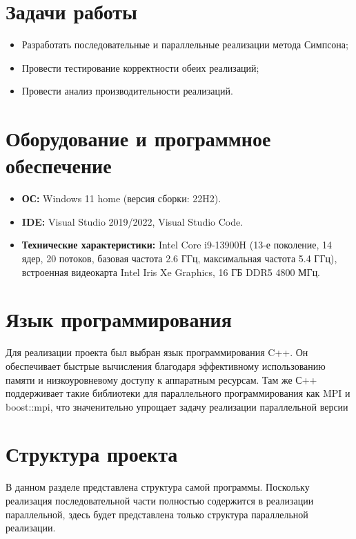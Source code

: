 \documentclass[12pt,a4paper]{article}
\begin{document}
\section*{Задачи работы}

\begin{itemize}
    \item Разработать последовательные и параллельные реализации метода Симпсона;
    \item Провести тестирование корректности обеих реализаций;
    \item Провести анализ производительности реализаций.
\end{itemize}

\section*{Оборудование и программное обеспечение}

\begin{itemize}
    \item \textbf{ОС:} Windows 11 home (версия сборки: 22H2).
    \item \textbf{IDE:} Visual Studio 2019/2022, Visual Studio Code.
    \item \textbf{Технические характеристики:} Intel Core i9-13900H (13-е поколение, 14 ядер, 20 потоков, базовая частота 2.6 ГГц, максимальная частота 5.4 ГГц), встроенная видеокарта Intel Iris Xe Graphics, 16 ГБ DDR5 4800 МГц.
\end{itemize}

\section*{Язык программирования}

Для реализации проекта был выбран язык программирования C++. Он обеспечивает быстрые вычисления благодаря эффективному использованию памяти и низкоуровневому доступу к аппаратным ресурсам. Там же С++  поддерживает такие библиотеки для параллельного программирования как MPI и boost::mpi, что значенительно упрощает задачу реализации параллельной версии

\section*{Структура проекта}

В данном разделе представлена структура самой программы. Поскольку реализация последовательной части полностью содержится в реализации параллельной, здесь будет представлена только структура параллельной реализации.
\end{document}
